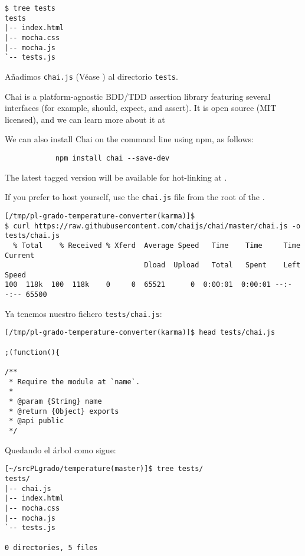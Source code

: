 \begin{verbatim}
$ tree tests
tests
|-- index.html
|-- mocha.css
|-- mocha.js
`-- tests.js
\end{verbatim}

Añadimos \verb|chai.js|
(Véase 
) al directorio \verb|tests|.

Chai is a platform-agnostic BDD/TDD assertion library featuring several interfaces 
(for example, should, expect, and assert). 
It is open source (MIT licensed), and we can learn more about it at

We can also install Chai on the command line using npm, as follows:
\begin{verbatim}
            npm install chai --save-dev
\end{verbatim}


The latest tagged version will be available for hot-linking at 
.

If you prefer to host yourself, use the \verb|chai.js| file from the root of the 
. 
\begin{verbatim}
[/tmp/pl-grado-temperature-converter(karma)]$ 
$ curl https://raw.githubusercontent.com/chaijs/chai/master/chai.js -o tests/chai.js
  % Total    % Received % Xferd  Average Speed   Time    Time     Time  Current
                                 Dload  Upload   Total   Spent    Left  Speed
100  118k  100  118k    0     0  65521      0  0:00:01  0:00:01 --:--:-- 65500
\end{verbatim}
Ya tenemos nuestro fichero \verb|tests/chai.js|:
\begin{verbatim}
[/tmp/pl-grado-temperature-converter(karma)]$ head tests/chai.js 

;(function(){

/**
 * Require the module at `name`.
 *
 * @param {String} name
 * @return {Object} exports
 * @api public
 */
\end{verbatim}
Quedando el árbol como sigue:
\begin{verbatim}
[~/srcPLgrado/temperature(master)]$ tree tests/
tests/
|-- chai.js
|-- index.html
|-- mocha.css
|-- mocha.js
`-- tests.js

0 directories, 5 files
\end{verbatim}

